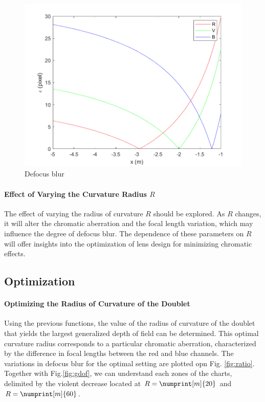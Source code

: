 \documentclass[10pt,letterpaper]{article}
\begin{document}
\begin{figure}[h]
	\centering
	\includegraphics[scale=0.75]{flou_defocalisation_RVB.png}
	\caption{Defocus blur}
	\label{fig:def-blur-2}
\end{figure}

\paragraph{Effect of Varying the Curvature Radius \(R\)\\}
The effect of varying the radius of curvature \(R\) should be explored. As \(R\) changes, it will alter the chromatic aberration and the focal length variation, which may influence the degree of defocus blur. The dependence of these parameters on \(R\) will offer insights into the optimization of lens design for minimizing chromatic effects.


\subsection*{Optimization}

\paragraph{Optimizing the Radius of Curvature of the Doublet\\}
Using the previous functions, the value of the radius of curvature of the doublet that yields the largest generalized depth of field can be determined. This optimal curvature radius corresponds to a particular chromatic aberration, characterized by the difference in focal lengths between the red and blue channels. The variations in defocus blur for the optimal setting are plotted opn Fig. \ref{fig:ratio}. Together with Fig.\ref{fig:gdof}, we can understand each zones of the charts, delimited by the violent decrease located at $R = \numprint[m]{20}$ and $R = \numprint[m]{60}$.
\end{document}
